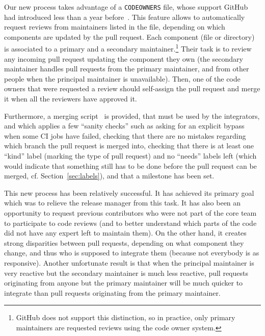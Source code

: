 Our new process takes advantage of a \verb|CODEOWNERS| file, whose support GitHub had introduced less than a year before~\cite{github_code_owners}.
This feature allows to automatically request reviews from maintainers listed in the file, depending on which components are updated by the pull request.
Each component (file or directory) is associated to a primary and a secondary maintainer.\footnote{
	GitHub does not support this distinction, so in practice, only primary maintainers are requested reviews using the code owner system.
}
Their task is to review any incoming pull request updating the component they own (the secondary maintainer handles pull requests from the primary maintainer, and from other people when the principal maintainer is unavailable).
Then, one of the code owners that were requested a review should self-assign the pull request and merge it when all the reviewers have approved it.

Furthermore, a merging script~\cite{merge_script} is provided, that must be used by the integrators, and which applies a few ``sanity checks'' such as asking for an explicit bypass when some CI jobs have failed, checking that there are no mistakes regarding which branch the pull request is merged into, checking that there is at least one ``kind'' label (marking the type of pull request) and no ``needs'' labels left (which would indicate that something still has to be done before the pull request can be merged, cf. Section~\ref{sec:labels}), and that a milestone has been set.

This new process has been relatively successful.
It has achieved its primary goal which was to relieve the release manager from this task.
It has also been an opportunity to request previous contributors who were not part of the core team to participate to code reviews (and to better understand which parts of the code did not have any expert left to maintain them).
On the other hand, it creates strong disparities between pull requests, depending on what component they change, and thus who is supposed to integrate them (because not everybody is as responsive).
Another unfortunate result is that when the principal maintainer is very reactive but the secondary maintainer is much less reactive, pull requests originating from anyone but the primary maintainer will be much quicker to integrate than pull requests originating from the primary maintainer.

